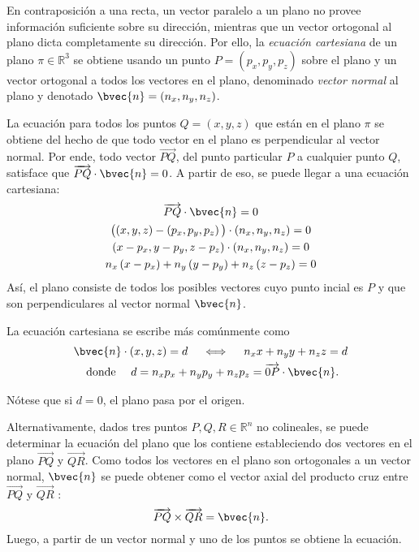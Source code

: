 \documentclass{fmbnotes}
\begin{document}
En contraposición a una recta, un vector paralelo a un plano no provee información suficiente sobre su dirección, mientras que un vector ortogonal al plano dicta completamente su dirección. Por ello, la \emph{ecuación cartesiana} de un plano \(\pi \in \mathbb{R}^{3}\) se obtiene usando un punto \( P=\left(p_{x}, p_{y}, p_{z}\right) \) sobre el plano y un vector ortogonal a todos los vectores en el plano, denominado \emph{vector normal} al plano y denotado \( \bvec{n}=\left(n_{x}, n_{y}, n_{z}\right) \).

La ecuación para todos los puntos \( Q=(x, y, z) \) que están en el plano \( \pi \) se obtiene del hecho de que todo vector en el plano es perpendicular al vector normal. Por ende, todo vector \( \overrightarrow{P Q} \), del punto particular \(P\) a cualquier punto \(Q\), satisface que  \( \overrightarrow{P Q} \cdot \bvec{n}=0  \). A partir de eso, se puede llegar a una ecuación cartesiana:
\begin{gather*}
	\overrightarrow{P Q} \cdot \bvec{n} =0 \\
	\big( (x, y, z)-\left(p_{x}, p_{y}, p_{z}\right) \big) \cdot \left(n_{x}, n_{y}, n_{z}\right) = 0 \\
	(x-p_{x}, y-p_{y}, z-p_{z}) \cdot \left(n_{x}, n_{y}, n_{z}\right) = 0 \\
	n_{x}\left(x-p_{x}\right)+n_{y}\left(y-p_{y}\right)+n_{z}\left(z-p_{z}\right)=0
\end{gather*}
Así, el plano consiste de todos los posibles vectores cuyo punto incial es \(P\) y que son perpendiculares al vector normal \(\bvec{n}\).

La ecuación cartesiana se escribe más comúnmente como
\begin{gather*}
	\bvec{n} \cdot (x,y,z) = d \quad \iff \quad n_{x} x+n_{y} y+n_{z} z=d \\
	\text{ donde } \quad d=n_{x} p_{x}+n_{y} p_{y}+n_{z} p_{z}=\overrightarrow{0 P} \cdot \bvec{n}.
\end{gather*}
\begin{tip}
	Nótese que si \(d=0\), el plano pasa por el origen.
\end{tip}

Alternativamente, dados tres puntos \( P, Q, R \in \mathbb{R}^{n} \) no colineales, se puede determinar la ecuación del plano que los contiene estableciendo dos vectores en el plano \( \overrightarrow{P Q} \) y \( \overrightarrow{Q R} \). Como todos los vectores en el plano son ortogonales a un vector normal, \( \bvec{n} \) se puede obtener como el vector axial del producto cruz entre \( \overrightarrow{P Q} \) y \( \overrightarrow{Q R} \) :
\[ \overrightarrow{P Q} \times \overrightarrow{Q R}=\bvec{n} .\]
Luego, a partir de un vector normal y uno de los puntos se obtiene la ecuación.
\end{document}
